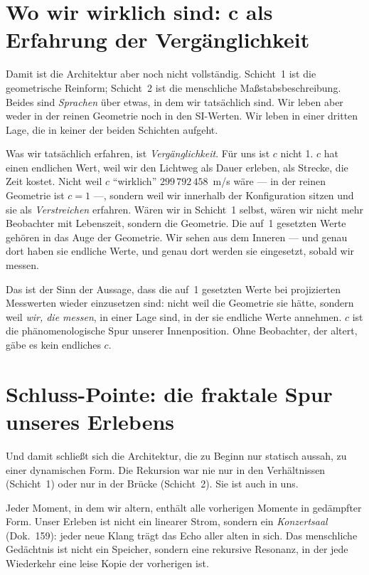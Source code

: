 \section{Wo wir wirklich sind: c als Erfahrung der Vergänglichkeit}

Damit ist die Architektur aber noch nicht vollständig. Schicht~1 ist
die geometrische Reinform; Schicht~2 ist die menschliche
Maßstabsbeschreibung. Beides sind \emph{Sprachen} über etwas, in dem
wir tatsächlich sind. Wir leben aber weder in der reinen Geometrie noch
in den SI-Werten. Wir leben in einer dritten Lage, die in keiner der
beiden Schichten aufgeht.

Was wir tatsächlich erfahren, ist \emph{Vergänglichkeit}. Für uns ist
$c$ nicht 1. $c$ hat einen endlichen Wert, weil wir den Lichtweg als
Dauer erleben, als Strecke, die Zeit kostet. Nicht weil $c$ ``wirklich''
$299\,792\,458$~m/s wäre --- in der reinen Geometrie ist $c = 1$ ---,
sondern weil wir innerhalb der Konfiguration sitzen und sie als
\emph{Verstreichen} erfahren. Wären wir in Schicht~1 selbst, wären wir
nicht mehr Beobachter mit Lebenszeit, sondern die Geometrie. Die
auf~1 gesetzten Werte gehören in das Auge der Geometrie. Wir sehen aus
dem Inneren --- und genau dort haben sie endliche Werte, und genau dort
werden sie eingesetzt, sobald wir messen.

Das ist der Sinn der Aussage, dass die auf~1 gesetzten Werte bei
projizierten Messwerten wieder einzusetzen sind: nicht weil die
Geometrie sie hätte, sondern weil \emph{wir, die messen}, in einer Lage
sind, in der sie endliche Werte annehmen. $c$ ist die phänomenologische
Spur unserer Innenposition. Ohne Beobachter, der altert, gäbe es kein
endliches $c$.

\section{Schluss-Pointe: die fraktale Spur unseres Erlebens}

Und damit schließt sich die Architektur, die zu Beginn nur statisch
aussah, zu einer dynamischen Form. Die Rekursion war nie nur in den
Verhältnissen (Schicht~1) oder nur in der Brücke (Schicht~2). Sie ist
auch in uns.

Jeder Moment, in dem wir altern, enthält alle vorherigen Momente in
gedämpfter Form. Unser Erleben ist nicht ein linearer Strom, sondern
ein \emph{Konzertsaal} (Dok.~159): jeder neue Klang trägt das Echo
aller alten in sich. Das menschliche Gedächtnis ist nicht ein Speicher,
sondern eine rekursive Resonanz, in der jede Wiederkehr eine leise
Kopie der vorherigen ist.

